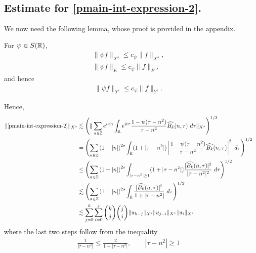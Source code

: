 \subsection{Estimate for \eqref{pmain-int-expression-2}.}
We now need the following lemma, whose proof is provided in the appendix.
%
%
%
%
%
%
%
%
\begin{lemma}
\label{plem:schwartz-mult}
  For $\psi \in S(\mathbb{R})$,
%
%
\begin{gather}
  \label{pschwartz-mult-piece-1}
    \|\psi f \|_{X^s} \le c_{\psi} \|f \|_{X^s},
    \\
    \label{pschwartz-mult-piece-2}
    \|\psi f \|_{E} \le c_{\psi} \|f \|_{E},
  \end{gather}
  and hence
  \begin{gather}
    \label{pschwartz-mult}
\|\psi f \|_{Y^s} \le c_{\psi} \|f \|_{Y^s}.
\end{gather}
%
%
\end{lemma}
%
%
Hence,
%
%
\begin{equation}
  \label{pmain-int2-est-X-s-part}
  \begin{split}
    \|\eqref{pmain-int-expression-2}\|_{X^s} 
    & \lesssim 
    \left( \| \sum_{n \in \zz} e^{ixn} \int_\rr 
    e^{it \tau} \frac{ 1 - \psi (\tau - n^{2} ) 
    }{\tau - n^{2}} \wh{B_k}(n, \tau) \ 
    d \tau\|_{X^s} \right)^{1/2}
    \\
    & =  \left( \sum_{n \in \zz} \left (1 + |n| \right )^{2s} \int_\rr
    (1 + |\tau - n^{2}|) \left | \frac{1 - \psi(\tau - n^{2 
    })}{\tau - n^{2}} 
    \wh{B_k}(n, \tau) \right |^2 \ d 
    \tau \right)^{1/2}
    \\
    & \le \left( \sum_{n \in \zz} \left (1 + |n| \right )^{2s} \int_{| \tau - n^{2}| \ge 1}
    (1 + |\tau - n^{2}|) \frac{|\wh{B_k}(n, \tau)|^2 }{|\tau - n^{2}|^2} 
    \ d 
    \tau \right)^{1/2}
    \\
    & \lesssim  \left( \sum_{n \in 
    \zz} \left (1 + |n| \right )^{2s} \int_\rr
    \frac{|\wh{B_k}(n, \tau) |^2}{1+ |\tau - 
    n^{2}|} 
     \ d \tau 
    \right)^{1/2}
    \\
    & \lesssim 
    \sum_{j=0}^{k} \sum_{i=0}^{j} {k \choose j}{j \choose i}
    \|u_{k-j}\|_{X^s} \| u_{j-i}\|_{X^s}
    \| u_i \|_{X^s}
  \end{split}
\end{equation}
%
%
where the last two steps follow from the inequality 
%
\begin{equation}
  \label{pone-plus-ineq}
  \begin{split}
    \frac{1}{|\tau - n^{2}| } \le \frac{2}{1 + |\tau - n^{2}| }, 
    \qquad |\tau - n^{2}| \ge 1
  \end{split}
\end{equation}
